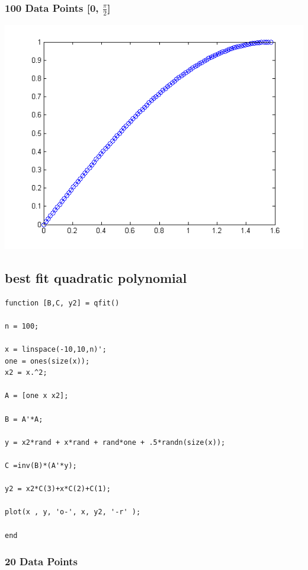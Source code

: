 \documentclass[12pt]{article}
\begin{document}
\subsubsection*{100 Data Points [0, $\frac{\pi}{2}$]}
\includegraphics[scale=.5]{plot6.png}

\subsection*{best fit quadratic polynomial}
\begin{verbatim}
function [B,C, y2] = qfit()

n = 100;

x = linspace(-10,10,n)';
one = ones(size(x));
x2 = x.^2;

A = [one x x2];

B = A'*A;

y = x2*rand + x*rand + rand*one + .5*randn(size(x));

C =inv(B)*(A'*y);

y2 = x2*C(3)+x*C(2)+C(1);

plot(x , y, 'o-', x, y2, '-r' );

end
\end{verbatim}
\subsubsection*{20 Data Points}
\end{document}
